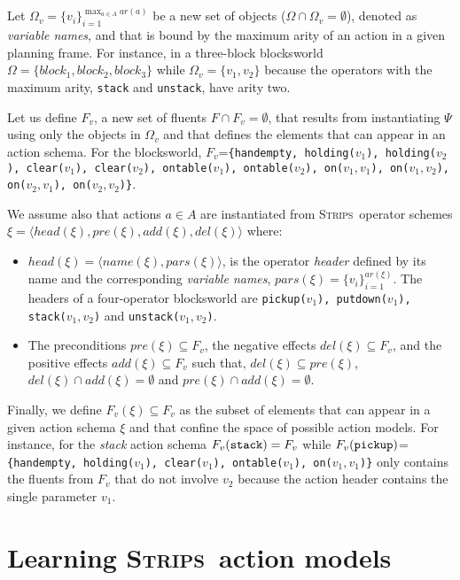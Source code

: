 \documentclass{article}
\newcommand{\tup}[1]{{\langle #1 \rangle}}
\newcommand{\strips}{\textsc{Strips}}     %
\begin{document}
Let $\Omega_v=\{v_i\}_{i=1}^{\operatorname*{max}_{a\in A} ar(a)}$ be a new set of objects ($\Omega\cap\Omega_v=\emptyset$), denoted as {\em variable names}, and that is bound by the maximum arity of an action in a given planning frame. For instance, in a three-block blocksworld $\Omega=\{block_1, block_2, block_3\}$ while $\Omega_v=\{v_1, v_2\}$ because the operators with the maximum arity, {\small\tt stack} and {\small\tt unstack}, have arity two.

Let us define $F_v$, a new set of fluents $F\cap F_v=\emptyset$, that results from instantiating $\Psi$ using only the objects in $\Omega_v$ and that defines the elements that can appear in an action schema. For the blocksworld, $F_v$={\small\tt\{handempty, holding($v_1$), holding($v_2$), clear($v_1$), clear($v_2$), ontable($v_1$), ontable($v_2$), on($v_1,v_1$), on($v_1,v_2$), on($v_2,v_1$), on($v_2,v_2$)\}}.

We assume also that actions $a\in A$ are instantiated from \strips\ operator schemes $\xi=\tup{head(\xi),pre(\xi),add(\xi),del(\xi)}$ where:
\begin{itemize}
\item $head(\xi)=\tup{name(\xi),pars(\xi)}$, is the operator {\em header} defined by its name and the corresponding {\em variable names}, $pars(\xi)=\{v_i\}_{i=1}^{ar(\xi)}$. The headers of a four-operator blocksworld are {\small\tt pickup($v_1$), putdown($v_1$), stack($v_1,v_2$)} and {\small\tt unstack($v_1,v_2$)}.
\item The preconditions $pre(\xi)\subseteq F_v$, the negative effects $del(\xi)\subseteq F_v$, and the positive effects $add(\xi)\subseteq F_v$ such that, $del(\xi)\subseteq pre(\xi)$, $del(\xi)\cap add(\xi)=\emptyset$ and $pre(\xi)\cap add(\xi)=\emptyset$.
\end{itemize}

Finally, we define $F_v(\xi)\subseteq F_v$ as the subset of elements that can appear in a given action schema $\xi$ and that confine the space of possible action models. For instance, for the {\em stack} action schema $F_v({\tt stack})=F_v$ while $F_v({\tt pickup})$={\small\tt\{handempty, holding($v_1$), clear($v_1$), ontable($v_1$), on($v_1,v_1$)\}} only contains the fluents from $F_v$ that do not involve $v_2$ because the action header contains the single parameter $v_1$.


\section{Learning \strips\ action models}
\end{document}
